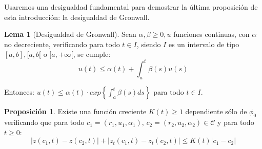 \documentclass[a4paper,10pt]{scrartcl}
\theoremstyle{definition}
\newtheorem{lemma}{Lema}
\newtheorem{fact}{Proposición}
\numberwithin{equation}{section}
\begin{document}
Usaremos una desigualdad fundamental para demostrar la última proposición de esta introducción: la desigualdad de Gronwall.

\begin{lemma}[Desigualdad de Gronwall]
Sean $\alpha, \beta \ge 0, u$ funciones continuas, con $\alpha$ no decreciente, verificando para todo $t\in I$, siendo $I$ es un intervalo de tipo $[a,b], [a,b[$ o $[a,+\infty[$, se cumple:
\[
 u(t) \le \alpha(t) + \int_a^t \beta(s) u(s)
\]

Entonces: $u(t) \le \alpha(t) \cdot exp\left\{\int_a^t \beta(s) ds\right\}$ para todo $t\in I$.
\label{ineq:gronwall}
\end{lemma}

\begin{fact}
 Existe una función creciente $K(t) \ge 1$ dependiente sólo de $\phi_0$ verificando que para todo $c_1=(r_1,u_1,\alpha_1), \, c_2=(r_2,u_2,\alpha_2) \in \mathcal{C}$ y para todo $t\ge 0$:
 \[|z(c_1,t) - z(c_2,t)| + |z_t(c_1,t) - z_t(c_2,t)| \le K(t)|c_1 - c_2|\]
 \label{fact:ineq-curves}
\end{fact}
\end{document}
